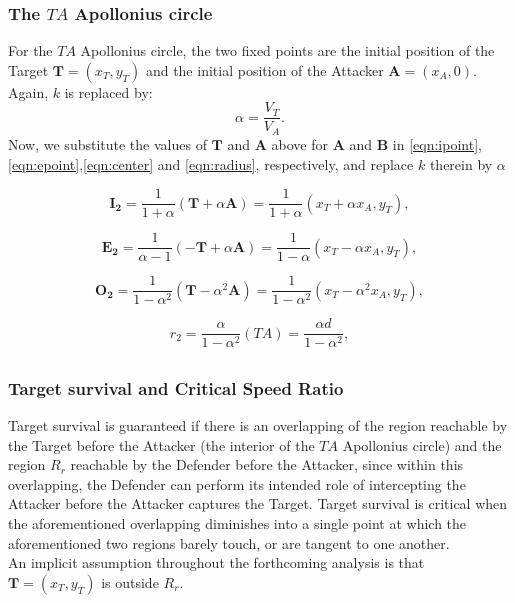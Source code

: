 \documentclass{beamer}
\begin{document}
\begin{frame}
\frametitle{The $TA$ Apollonius circle}
For the $TA$ Apollonius circle, the two fixed points are the initial position of the Target $\boldsymbol{T}=(x_{T},y_{T})$ and the initial position of the Attacker  $\boldsymbol{A}=(x_{A},0)$.
Again, $k$ is replaced by:
\begin{equation}
\alpha= \dfrac{V_{T}}{V_{A}}.
\end{equation}
Now, we substitute the values of $\boldsymbol{T}$ and $\boldsymbol{A}$ above for $\boldsymbol{A}$ and $\boldsymbol{B}$ in \eqref{eqn:ipoint},\eqref{eqn:epoint},\eqref{eqn:center} and \eqref{eqn:radius}, respectively, and replace $k$ therein by $\alpha$

\begin{equation}
\boldsymbol{I_{2}} =\dfrac{1}{1+\alpha}(\boldsymbol{T}+\alpha \boldsymbol{A}) =\dfrac{1}{1+\alpha}(x_{T}+\alpha x_{A},y_{T}),
\end{equation}

\begin{equation}
\boldsymbol{E_{2}} =\dfrac{1}{\alpha-1}(-\boldsymbol{T}+\alpha \boldsymbol{A}) =\dfrac{1}{1-\alpha}(x_{T}-\alpha x_{A},y_{T}),
\end{equation}

\begin{equation}
\boldsymbol{O_{2}} =\dfrac{1}{1-\alpha^{2}}(\boldsymbol{T}-\alpha^{2} \boldsymbol{A}) =\dfrac{1}{1-\alpha^{2}}(x_{T}-\alpha^{2} x_{A},y_{T}),
\label{O2}
\end{equation}

\begin{equation}
r_{2} =\dfrac{\alpha}{1-\alpha^{2}}(TA)
 = \dfrac{\alpha d}{1-\alpha^{2}},
 \label{r2}
\end{equation}
%
\end{frame}

\subsection{}

\begin{frame}
\frametitle{Target survival and Critical Speed Ratio}
Target survival is guaranteed if there is an overlapping of the region reachable by the Target before the Attacker (the interior of the $TA$ Apollonius circle) and the region $R_r$ reachable by the Defender before the Attacker, since within this overlapping, the Defender can perform its intended role of intercepting the Attacker before the Attacker captures the Target. Target survival is critical when the aforementioned overlapping diminishes into a single point at which the aforementioned two regions barely touch, or are tangent to one another.\\

 An implicit assumption throughout the forthcoming analysis is that $\boldsymbol{T}=(x_T , y_T)$ is outside $R_r$. 
\end{frame}
\end{document}
